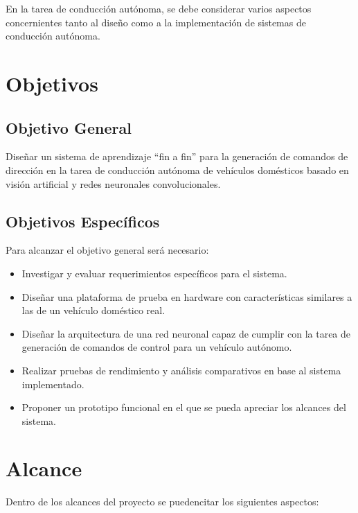 \documentclass[12pt,letterpaper]{article}
\begin{document}
En la tarea de conducción autónoma, se debe considerar varios aspectos concernientes tanto al diseño como a la 
implementación de sistemas de conducción autónoma. 
\section{Objetivos}
\subsection{Objetivo General}

Diseñar un sistema de aprendizaje “fin a fin” para la generación de comandos de 
dirección en la tarea de conducción autónoma de vehículos domésticos basado en 
visión artificial y redes neuronales convolucionales.

\subsection{Objetivos Específicos}
Para alcanzar el objetivo general será necesario:

\begin{itemize}
    \item Investigar y evaluar requerimientos específicos para el sistema.
    \item Diseñar una plataforma de prueba en hardware con características similares a las de un vehículo doméstico real.
    \item Diseñar la arquitectura de una red neuronal capaz de cumplir con la tarea de generación de comandos 
    de control para un vehículo autónomo.
    \item Realizar pruebas de rendimiento y análisis comparativos en base al sistema implementado.
    \item Proponer un prototipo funcional en el que se pueda apreciar los alcances del sistema.
\end{itemize}


\section{Alcance}

Dentro de los alcances del proyecto se puedencitar los siguientes
aspectos:
\end{document}
